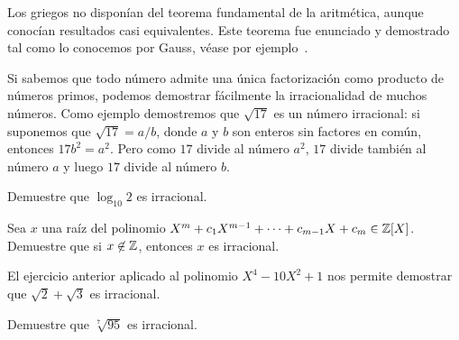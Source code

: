 Los griegos no disponían del teorema fundamental de la aritmética, 
aunque conocían resultados casi equivalentes. Este teorema
fue enunciado y demostrado tal como lo conocemos por Gauss, 
véase por ejemplo~\cite{MR1277244,MR1849798,MR1163928,MR497463}. 

Si sabemos que todo número admite una única
factorización como producto de números primos, podemos demostrar fácilmente la
irracionalidad de muchos números. Como ejemplo demostremos que $\sqrt{17}$ es
un número irracional: si suponemos que $\sqrt{17}=a/b$, donde $a$ y $b$ son
enteros sin factores en común, entonces $17b^2=a^2$. Pero como $17$ divide al
número $a^2$, $17$ divide también al número $a$ y luego $17$ divide al número
$b$.

\begin{exercise}
	Demuestre que $\log_{10}2$ es irracional.
\end{exercise}

\begin{exercise}
	Sea $x$ una raíz del polinomio $X^m+c_1X^{m-1}+\cdots+c_{m-1}X+c_m\in\mathbb{Z}[X]$. 
	Demuestre que si $x\not\in\mathbb{Z}$, entonces $x$ es irracional. 
\end{exercise}


El ejercicio anterior aplicado al polinomio $X^4-10X^2+1$ 
nos permite demostrar que $\sqrt{2}+\sqrt{3}$ es irracional. 

\begin{exercise}
	Demuestre que $\sqrt[7]{95}$ es irracional.
\end{exercise}

